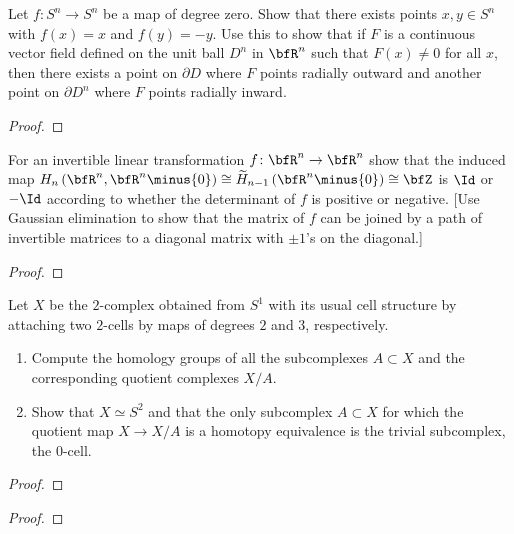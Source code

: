 \begin{problem}[Hatcher {\S}2.2, Ex.\@ 3]
Let $f\colon S^n\to S^n$ be a map of degree zero. Show that there exists
points $x,y\in S^n$ with $f(x)=x$ and $f(y)=-y$. Use this to show that if
$F$ is a continuous vector field defined on the unit ball $D^n$ in $\bfR^n$
such that $F(x)\neq 0$ for all $x$, then there exists a point on $\partial
D$ where $F$ points radially outward and another point on $\partial D^n$
where  $F$ points radially inward.
\end{problem}
\begin{proof}
\end{proof}
\newpage

\begin{problem}[Hatcher {\S}2.2, Ex.\@ 7]
For an invertible linear transformation $f\colon\bfR^n\to\bfR^n$ show that
the induced map $H_n\left(\bfR^n,\bfR^n\minus\{0\}\right)\cong\widetilde
H_{n-1}\left(\bfR^n\minus\{0\}\right)\cong\bfZ$ is $\Id$ or $-\Id$
according to whether the determinant of $f$ is positive or negative. [Use
Gaussian elimination to show that the matrix of $f$ can be joined by a path
of invertible matrices to a diagonal matrix with $\pm 1$'s on the
diagonal.]
\end{problem}
\begin{proof}
\end{proof}
\newpage


\begin{problem}[Hatcher {\S}2.2, Ex.\@ 13]
Let $X$ be the $2$-complex obtained from $S^1$ with its usual cell
structure by attaching two $2$-cells by maps of degrees $2$ and $3$,
respectively.
\begin{enumerate}[label=(\alph*)]
\item Compute the homology groups of all the subcomplexes $A\subset X$ and
  the corresponding quotient complexes $X/A$.
\item Show that $X\simeq S^2$ and that the only subcomplex $A\subset X$ for
  which the quotient map $X\to X/A$ is a homotopy equivalence is the
  trivial subcomplex, the $0$-cell.
\end{enumerate}
\end{problem}
\begin{proof}
\end{proof}
\newpage

\begin{problem}
\end{problem}
\begin{proof}
\end{proof}

